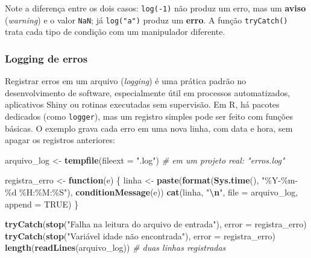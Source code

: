 \documentclass[
]{book}
\newenvironment{Shaded}{\begin{snugshade}}{\end{snugshade}}
\newcommand{\AttributeTok}[1]{\textcolor[rgb]{0.13,0.29,0.53}{#1}}
\newcommand{\CommentTok}[1]{\textcolor[rgb]{0.56,0.35,0.01}{\textit{#1}}}
\newcommand{\ConstantTok}[1]{\textcolor[rgb]{0.56,0.35,0.01}{#1}}
\newcommand{\ControlFlowTok}[1]{\textcolor[rgb]{0.13,0.29,0.53}{\textbf{#1}}}
\newcommand{\FunctionTok}[1]{\textcolor[rgb]{0.13,0.29,0.53}{\textbf{#1}}}
\newcommand{\NormalTok}[1]{#1}
\newcommand{\OtherTok}[1]{\textcolor[rgb]{0.56,0.35,0.01}{#1}}
\newcommand{\SpecialCharTok}[1]{\textcolor[rgb]{0.81,0.36,0.00}{\textbf{#1}}}
\newcommand{\StringTok}[1]{\textcolor[rgb]{0.31,0.60,0.02}{#1}}
\begin{document}
Note a diferença entre os dois casos: \texttt{log(-1)} não produz um erro, mas um \textbf{aviso} (\emph{warning}) e o valor \texttt{NaN}; já \texttt{log("a")} produz um \textbf{erro}. A função \texttt{tryCatch()} trata cada tipo de condição com um manipulador diferente.

\subsubsection{Logging de erros}\label{logging-de-erros}

Registrar erros em um arquivo (\emph{logging}) é uma prática padrão no desenvolvimento de software, especialmente útil em processos automatizados, aplicativos Shiny ou rotinas executadas sem supervisão. Em R, há pacotes dedicados (como \texttt{logger}), mas um registro simples pode ser feito com funções básicas. O exemplo grava cada erro em uma nova linha, com data e hora, sem apagar os registros anteriores:

\begin{Shaded}
\begin{Highlighting}[]
\NormalTok{arquivo\_log }\OtherTok{\textless{}{-}} \FunctionTok{tempfile}\NormalTok{(}\AttributeTok{fileext =} \StringTok{".log"}\NormalTok{)   }\CommentTok{\# em um projeto real: "erros.log"}

\NormalTok{registra\_erro }\OtherTok{\textless{}{-}} \ControlFlowTok{function}\NormalTok{(e) \{}
\NormalTok{  linha }\OtherTok{\textless{}{-}} \FunctionTok{paste}\NormalTok{(}\FunctionTok{format}\NormalTok{(}\FunctionTok{Sys.time}\NormalTok{(), }\StringTok{"\%Y{-}\%m{-}\%d \%H:\%M:\%S"}\NormalTok{), }\FunctionTok{conditionMessage}\NormalTok{(e))}
  \FunctionTok{cat}\NormalTok{(linha, }\StringTok{"}\SpecialCharTok{\textbackslash{}n}\StringTok{"}\NormalTok{, }\AttributeTok{file =}\NormalTok{ arquivo\_log, }\AttributeTok{append =} \ConstantTok{TRUE}\NormalTok{)}
\NormalTok{\}}

\FunctionTok{tryCatch}\NormalTok{(}\FunctionTok{stop}\NormalTok{(}\StringTok{"Falha na leitura do arquivo de entrada"}\NormalTok{), }\AttributeTok{error =}\NormalTok{ registra\_erro)}
\FunctionTok{tryCatch}\NormalTok{(}\FunctionTok{stop}\NormalTok{(}\StringTok{"Variável \textquotesingle{}idade\textquotesingle{} não encontrada"}\NormalTok{), }\AttributeTok{error =}\NormalTok{ registra\_erro)}
\FunctionTok{length}\NormalTok{(}\FunctionTok{readLines}\NormalTok{(arquivo\_log))   }\CommentTok{\# duas linhas registradas}
\end{Highlighting}
\end{Shaded}
\end{document}

